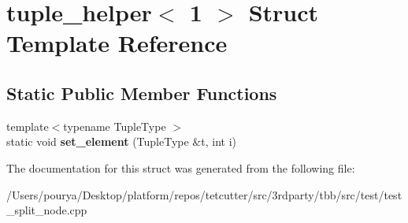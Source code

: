 \hypertarget{structtuple__helper_3_011_01_4}{}\section{tuple\+\_\+helper$<$ 1 $>$ Struct Template Reference}
\label{structtuple__helper_3_011_01_4}
\subsection*{Static Public Member Functions}
\begin{DoxyCompactItemize}
\item 
\hypertarget{structtuple__helper_3_011_01_4_a058923a24ac0d0746422792c25bd0575}{}{\footnotesize template$<$typename Tuple\+Type $>$ }\\static void {\bfseries set\+\_\+element} (Tuple\+Type \&t, int i)\label{structtuple__helper_3_011_01_4_a058923a24ac0d0746422792c25bd0575}

\end{DoxyCompactItemize}


The documentation for this struct was generated from the following file\+:\begin{DoxyCompactItemize}
\item 
/\+Users/pourya/\+Desktop/platform/repos/tetcutter/src/3rdparty/tbb/src/test/test\+\_\+split\+\_\+node.\+cpp\end{DoxyCompactItemize}
